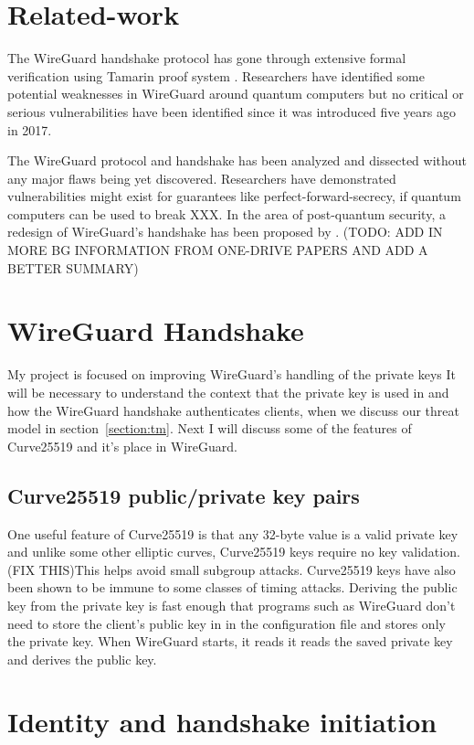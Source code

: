 \documentclass [11pt, proquest] {uwthesis}[2020/02/24]
\begin{document}
\section {Related-work}
The WireGuard handshake protocol has gone through extensive formal verification using Tamarin proof system \cite{donenfeld_formal_2018}. Researchers have identified some potential weaknesses in WireGuard around quantum computers but no critical or serious vulnerabilities have been identified since it was introduced five years ago in 2017.

The WireGuard protocol and handshake has been analyzed and dissected without any major flaws being yet discovered. Researchers have demonstrated vulnerabilities might exist for guarantees like perfect-forward-secrecy, if quantum computers can be used to break XXX.  In the area of post-quantum security, a redesign of WireGuard's handshake has been proposed by \cite{hulsing_post-quantum_2021}.
(TODO: ADD IN MORE BG INFORMATION FROM ONE-DRIVE PAPERS AND ADD A BETTER SUMMARY)

\section {WireGuard Handshake}
My project is focused on improving WireGuard's handling of the private keys 
It will be necessary to understand the context that the private key is used in and how the WireGuard handshake authenticates clients, when we discuss our threat model in section~\ref{section:tm}. Next I will discuss some of the features of Curve25519 and it's place in WireGuard.

\subsection{Curve25519 public/private key pairs}
One useful feature of Curve25519 is that any 32-byte value is a valid private key and unlike some other elliptic curves, Curve25519 keys require no key validation. (FIX THIS)This helps avoid small subgroup attacks. Curve25519 keys have also been shown to be immune to some classes of timing attacks\cite{noauthor_safecurves_2022}\cite{sasdrich_implementing_2015}.  Deriving the public key from the private key is fast enough that programs such as WireGuard don't need to store the client's public key in in the configuration file and stores only the private key. When WireGuard starts, it reads it reads the saved private key and derives the public key. 


\section {Identity and handshake initiation}
\end{document}
